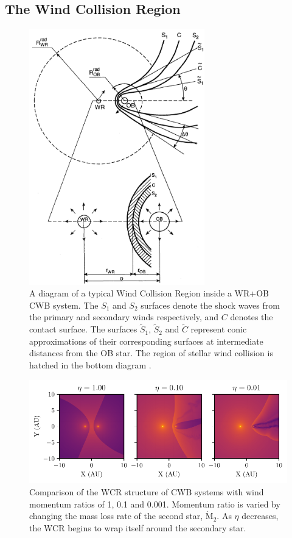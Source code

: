 \subsection{The Wind Collision Region}
\label{sec:wcr}

\begin{figure}[h]
  \centering
  \includegraphics[width=3in]{assets/cwb-diagrams/eichler.png}
  \caption[\textit{A diagram of the Wind Collision Region \parencite{eichler_particle_1993}}]{A diagram of a typical Wind Collision Region inside a WR+OB CWB system. The $S_1$ and $S_2$ surfaces denote the shock waves from the primary and secondary winds respectively, and $C$ denotes the contact surface. The surfaces $\widetilde{S}_1$, $\widetilde{S}_2$ and $\widetilde{C}$ represent conic approximations of their corresponding surfaces at intermediate distances from the OB star. The region of stellar wind collision is hatched in the bottom diagram \parencite{eichler_particle_1993}.}
  \label{fig:wcr-diagram}
\end{figure}

\begin{figure}[h]
  \centering
  \includegraphics{assets/cwb-structure/ch1-eta-rho.pdf}
  \caption[Comparison of wind momentum ratio, $\eta$, on WCR structure]{Comparison of the WCR structure of CWB systems with wind momentum ratios of \num{1}, \num{0.1} and \num{0.001}. Momentum ratio is varied by changing the mass loss rate of the second star, $\dot{\text{M}}_2$. As $\eta$ decreases, the WCR begins to wrap itself around the secondary star.}
  \label{fig:wcr-eta}
\end{figure}

